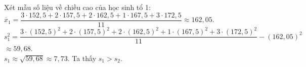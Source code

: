 \begin{ex}
{\begin{itemchoice}
			Xét mẫu số liệu về chiều cao của học sinh tổ 1:\\
			$\overline{x}_1=\dfrac{3\cdot 152{,}5+2\cdot 157{,}5+2\cdot 162{,}5+1\cdot 167{,}5+3\cdot 172{,}5}{11} \approx 162{,}05$.\\
			$s_1^2=\dfrac{3\cdot(152{,}5)^2+2\cdot(157{,}5)^2+2\cdot(162{,}5)^2+1\cdot(167{,}5)^2+3\cdot(172{,}5)^2}{11}-(162{,}05)^2$\\ $\approx 59{,}68$.\\
			$s_1\approx \sqrt{59{,}68}\approx 7{,}73$. Ta thấy $s_1>s_2$.
		\end{itemchoice}
	}
\end{ex}

